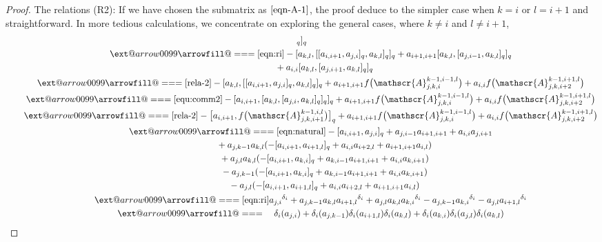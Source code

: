 \documentclass[10pt,a4paper]{amsart}
\makeatletter
\def\x@arrow{\DOTSB\Relbar}
\def\xlongequalsignfill@{\arrowfill@\x@arrow\Relbar\x@arrow}
\providecommand{\xlongequal}[2][]{%
	\ext@arrow 0099\xlongequalsignfill@{#1}{#2}}
\numberwithin{equation}{section}
\def\d{\delta}
\def\A{\mathscr{A}}
\makeatother
\begin{document}
\begin{proof}
The relations (R2):
If we have chosen the submatrix \smash{$\A_{j,k,i+1}^{k-1,i,l}$} as $\eqref{eqn-A-1}$, the proof deduce to the simpler case when $k=i$ or $l=i+1$ and straightforward.
In more tedious calculations, we concentrate on exploring the general cases, where $k \neq i$ and $l \neq i+1$,
\begin{gather*}
 [\d_i (a_{k, l} ), [\d_i (a_{j, i} ),\d_i (a_{k, l} ) ]_q ]_q\\
\qquad \xlongequal{\eqref{eqn:ri}} - [ a_{k, l} , [ [a_{i, i+1}, a_{j, i} ]_q , a_{k, l} ]_q ]_q +a_{i+1, i+1} [ a_{k, l} , [a_{j, i-1} , a_{k, l} ]_q ]_q\\
 \qquad\qquad \quad{} +a_{i,i} [ a_{k, l} , [a_{j, i+1} , a_{k, l} ]_q ]_q\\
\qquad \xlongequal{\eqref{rela-2}} {}- [ a_{k, l} , [ [a_{i, i+1}, a_{j, i} ]_q , a_{k, l} ]_q ]_q +a_{i+1, i+1}f\bigl(\A_{j,k,i}^{k-1,i-1,l}\bigr)+a_{i,i}f\bigl(\A_{j,k,i+2}^{k-1,i+1,l}\bigr)\\
\qquad \xlongequal{\eqref{equ:comm2}} - [a_{i, i+1}, [a_{k, l}, [a_{j, i}, a_{k, l} ]_q ]_q ]_q +a_{i+1, i+1}f\bigl(\A_{j,k,i}^{k-1,i-1,l}\bigr) +a_{i,i}f\bigl(\A_{j,k,i+2}^{k-1,i+1,l}\bigr)\\
\qquad \xlongequal{\eqref{rela-2}} - \bigl[a_{i, i+1},f \bigl(\A_{j,k,i+1}^{k-1,i,l} \bigr) \bigr]_q +a_{i+1, i+1}f\bigl(\A_{j,k,i}^{k-1,i-1,l}\bigr) +a_{i,i}f \bigl(\A_{j,k,i+2}^{k-1,i+1,l} \bigr)\\
 \qquad\xlongequal{\eqref{eqn:natural}} - [a_{i, i+1}, a_{j, i} ]_q+a_{j, i-1}a_{i+1, i+1}+a_{i,i}a_{j, i+1} \\
 \qquad\qquad \quad {} +a_{j,k-1} a_{k, l} (- [a_{i, i+1}, a_{i+1, l} ]_q+a_{i,i}a_{i+2,l}+a_{i+1, i+1}a_{i, l} ) \\
 \qquad\qquad \quad{} + a_{j, l}a_{k, l} (- [a_{i, i+1}, a_{k,i} ]_q+a_{k, i-1}a_{i+1, i+1}+a_{i,i}a_{k, i+1} ) \\
 \qquad\qquad\quad{} -a_{j,k-1} (- [a_{i, i+1}, a_{k,i} ]_q+a_{k, i-1}a_{i+1, i+1}+a_{i,i}a_{k, i+1} )\\
 \qquad\qquad \quad{} -a_{j, l} (- [a_{i, i+1}, a_{i+1, l} ]_q+a_{i,i}a_{i+2,l}+a_{i+1, i+1}a_{i, l} ) \\
\qquad \xlongequal{\eqref{eqn:ri}} {a_{j, i}}^{\d_i} +a_{j,k-1}a_{k, l}{a_{i+1, l}}^{\d_i}+a_{j, l}a_{k,l} {a_{k,i}}^{\d_i}-a_{j,k-1}{a_{k,i}}^{\d_i} -a_{j, l}{a_{i+1, l}}^{\d_i}\\
 \qquad\xlongequal{\quad} \d_i (a_{j, i} ) +\d_i (a_{j,k-1} )\d_i (a_{i+1,l} ) \d_i (a_{k, l} )+\d_i (a_{k,i} )\d_i (a_{j, l} )\d_i (a_{k, l} ) \\

\end{gather*}
\end{proof}
\end{document}
